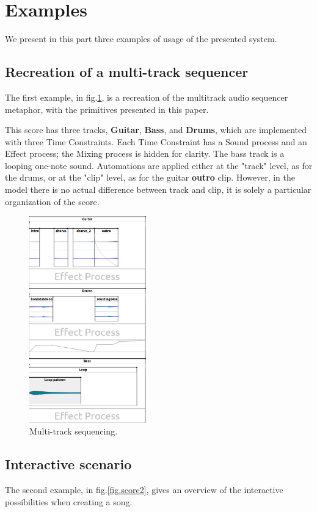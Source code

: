 \documentclass{article}
\begin{document}
\section{Examples}
We present in this part three examples of usage of the presented system.

\subsection{Recreation of a multi-track sequencer}
The first example, in fig.\ref{fig.score1}, is a recreation of the multitrack audio sequencer metaphor, with the primitives presented in this paper.
 
This score has three tracks, \textbf{Guitar}, \textbf{Bass}, and \textbf{Drums}, which are implemented with three Time Constraints.
Each Time Constraint has a Sound process and an Effect process; the Mixing process is hidden for clarity.
The bass track is a looping one-note sound. Automations are applied either at the "track" level, as for the drums, or at the "clip" level, as for the guitar \textbf{outro} clip. 
However, in the model there is no actual difference between track and clip, it is solely a particular organization of the score.
 
\begin{figure}[h]
    \centering
    \includegraphics[width=0.45\textwidth]{figures/ex1.png}
    \caption{Multi-track sequencing.}
    \label{fig.score1}
\end{figure}

\subsection{Interactive scenario}
The second example, in fig.\ref{fig.score2}, gives an overview of the interactive possibilities when creating a song.
\end{document}
